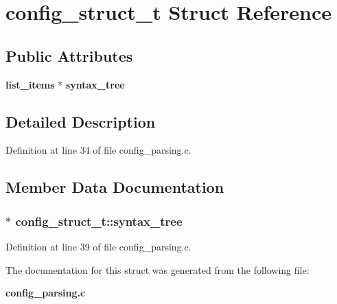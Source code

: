 \section{config\_\-struct\_\-t Struct Reference}
\label{structconfig__struct__t}
\subsection*{Public Attributes}
\begin{DoxyCompactItemize}
\item 
{\bf list\_\-items} $\ast$ {\bf syntax\_\-tree}
\end{DoxyCompactItemize}


\subsection{Detailed Description}


Definition at line 34 of file config\_\-parsing.c.

\subsection{Member Data Documentation}
\subsubsection[{syntax\_\-tree}]{$\ast$ {\bf config\_\-struct\_\-t::syntax\_\-tree}}\label{structconfig__struct__t_a2fb873f65294aa91fe5a3481dda831df}


Definition at line 39 of file config\_\-parsing.c.

The documentation for this struct was generated from the following file:\begin{DoxyCompactItemize}
\item 
{\bf config\_\-parsing.c}\end{DoxyCompactItemize}
